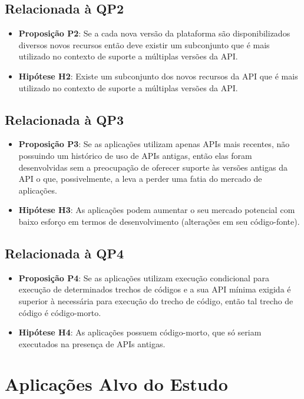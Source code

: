 \subsection{Relacionada à QP2}
	\begin{itemize}
		\item \textbf{Proposição P2}: Se a cada nova versão da plataforma são disponibilizados
		diversos novos recursos então deve existir um subconjunto que é mais utilizado no 
		contexto de suporte a múltiplas versões da API.
		\item \textbf{Hipótese H2}: Existe um subconjunto dos novos recursos da API que é
		mais utilizado no contexto de suporte a múltiplas versões da API.
	\end{itemize}

\subsection{Relacionada à QP3}
	\begin{itemize}
		\item \textbf{Proposição P3}: Se as aplicações utilizam apenas APIs mais recentes,
		não possuindo um histórico de uso de APIs antigas, então elas foram desenvolvidas
		sem a preocupação de oferecer suporte às versões antigas da API o que, possivelmente,
		a leva a perder uma fatia do mercado de aplicações.
		\item \textbf{Hipótese H3}: As aplicações podem aumentar o seu mercado potencial com
		baixo esforço em termos de desenvolvimento (alterações em seu código-fonte).
	\end{itemize}

\subsection{Relacionada à QP4}
	\begin{itemize}
		\item \textbf{Proposição P4}: Se as aplicações utilizam execução condicional para
		execução de determinados trechos de códigos e a sua API mínima exigida é superior
		à necessária para execução do trecho de código, então tal trecho de código é código-morto.   
		\item \textbf{Hipótese H4}: As aplicações possuem código-morto, que só seriam executados
		na presença de APIs antigas.
	\end{itemize}

\section{Aplicações Alvo do Estudo} \label{sec:aplicacoes-alvo}

